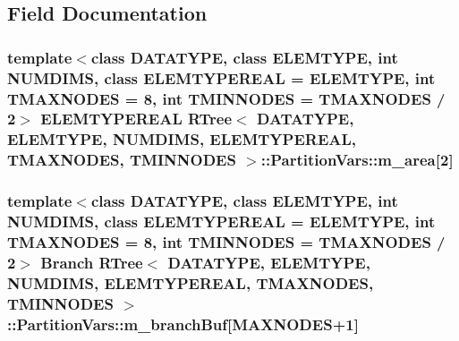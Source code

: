 \subsection{Field Documentation}
\hypertarget{structRTree_1_1PartitionVars_aadf67cd0f0c071993f47b77b1e7a3b78}{
\subsubsection[{m\-\_\-area}]{\setlength{\rightskip}{0pt plus 5cm}template$<$class D\-A\-T\-A\-T\-Y\-P\-E, class E\-L\-E\-M\-T\-Y\-P\-E, int N\-U\-M\-D\-I\-M\-S, class E\-L\-E\-M\-T\-Y\-P\-E\-R\-E\-A\-L = E\-L\-E\-M\-T\-Y\-P\-E, int T\-M\-A\-X\-N\-O\-D\-E\-S = 8, int T\-M\-I\-N\-N\-O\-D\-E\-S = T\-M\-A\-X\-N\-O\-D\-E\-S / 2$>$ E\-L\-E\-M\-T\-Y\-P\-E\-R\-E\-A\-L {\bf R\-Tree}$<$ D\-A\-T\-A\-T\-Y\-P\-E, E\-L\-E\-M\-T\-Y\-P\-E, N\-U\-M\-D\-I\-M\-S, E\-L\-E\-M\-T\-Y\-P\-E\-R\-E\-A\-L, T\-M\-A\-X\-N\-O\-D\-E\-S, T\-M\-I\-N\-N\-O\-D\-E\-S $>$\-::Partition\-Vars\-::m\-\_\-area\mbox{[}2\mbox{]}}}\label{structRTree_1_1PartitionVars_aadf67cd0f0c071993f47b77b1e7a3b78}
\hypertarget{structRTree_1_1PartitionVars_a73b5e398b4073ff923afaa765367958b}{
\subsubsection[{m\-\_\-branch\-Buf}]{\setlength{\rightskip}{0pt plus 5cm}template$<$class D\-A\-T\-A\-T\-Y\-P\-E, class E\-L\-E\-M\-T\-Y\-P\-E, int N\-U\-M\-D\-I\-M\-S, class E\-L\-E\-M\-T\-Y\-P\-E\-R\-E\-A\-L = E\-L\-E\-M\-T\-Y\-P\-E, int T\-M\-A\-X\-N\-O\-D\-E\-S = 8, int T\-M\-I\-N\-N\-O\-D\-E\-S = T\-M\-A\-X\-N\-O\-D\-E\-S / 2$>$ {\bf Branch} {\bf R\-Tree}$<$ D\-A\-T\-A\-T\-Y\-P\-E, E\-L\-E\-M\-T\-Y\-P\-E, N\-U\-M\-D\-I\-M\-S, E\-L\-E\-M\-T\-Y\-P\-E\-R\-E\-A\-L, T\-M\-A\-X\-N\-O\-D\-E\-S, T\-M\-I\-N\-N\-O\-D\-E\-S $>$\-::Partition\-Vars\-::m\-\_\-branch\-Buf\mbox{[}{\bf M\-A\-X\-N\-O\-D\-E\-S}+1\mbox{]}}}\label{structRTree_1_1PartitionVars_a73b5e398b4073ff923afaa765367958b}
